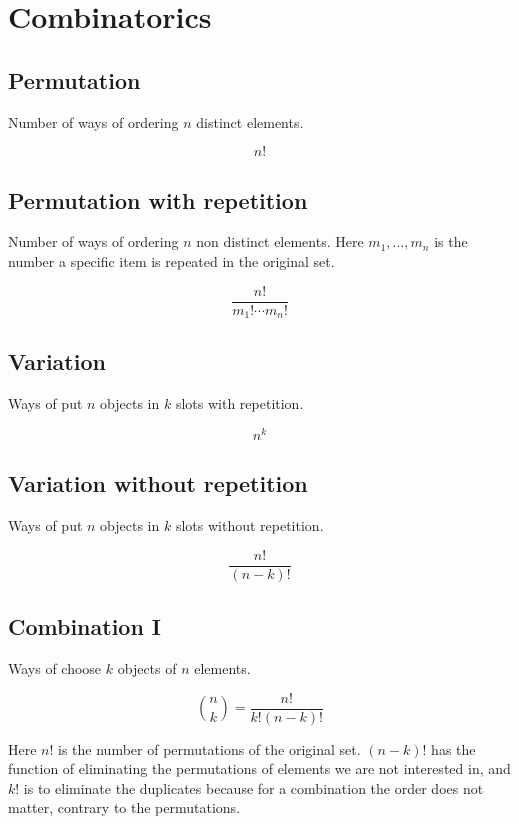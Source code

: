 \newpage
\section{Combinatorics}

\subsection{Permutation}

Number of ways of ordering \(n\) distinct elements.

\[n!\]

\subsection{Permutation with repetition}

Number of ways of ordering \(n\) non distinct elements. Here \(m_1, \dots, m_n\)
is the number a specific item is repeated in the original set.

\[\frac{n!}{m_1! \cdots m_n!}\]

\subsection{Variation}

Ways of put \(n\) objects in \(k\) slots with repetition.

\[n^k\]

\subsection{Variation without repetition}

Ways of put \(n\) objects in \(k\) slots without repetition.

\[\frac{n!}{(n -k)!}\]

\subsection{Combination I}

Ways of choose \(k\) objects of \(n\) elements.

\[\binom{n}{k} = \frac{n!}{k!(n-k)!}\]

Here \(n\)! is the number of permutations of the original set.
\((n-k)\)! has the function of eliminating the permutations of elements we are not interested in, and
\(k\)! is to eliminate the duplicates because for a combination the order does not matter, contrary to
the permutations.

